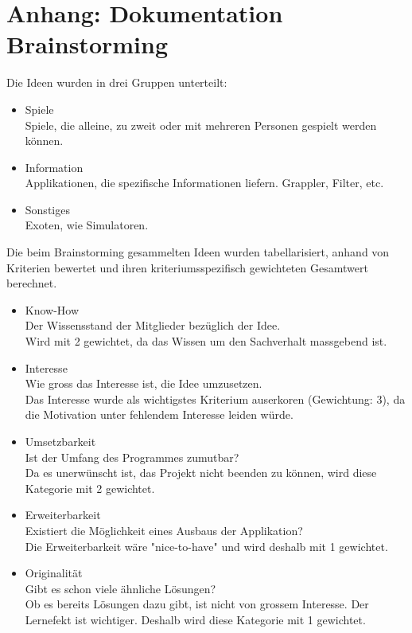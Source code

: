 \documentclass[10pt,a4paper,titlepage,twoside,german]{zhawreprt}
\begin{document}
\chapter{Anhang: Dokumentation Brainstorming}\label{chp:AppendixBrainstorming}
Die Ideen wurden in drei Gruppen unterteilt:
\begin{itemize}
\item Spiele\\
Spiele, die alleine, zu zweit oder mit mehreren Personen gespielt werden können.
\item Information\\
Applikationen, die spezifische Informationen liefern. Grappler, Filter, etc.
\item Sonstiges\\
Exoten, wie Simulatoren.
\end{itemize}
Die beim Brainstorming gesammelten Ideen wurden tabellarisiert, anhand von Kriterien bewertet und ihren kriteriumsspezifisch gewichteten Gesamtwert berechnet.
\begin{itemize}
\item Know-How\\
Der Wissensstand der Mitglieder bezüglich der Idee.\\
Wird mit 2 gewichtet, da das Wissen um den Sachverhalt massgebend ist.
\item Interesse\\
Wie gross das Interesse ist, die Idee umzusetzen.\\
Das Interesse wurde als wichtigstes Kriterium auserkoren (Gewichtung: 3), da die Motivation unter fehlendem Interesse leiden würde.
\item Umsetzbarkeit\\
Ist der Umfang des Programmes zumutbar?\\
Da es unerwünscht ist, das Projekt nicht beenden zu können, wird diese Kategorie mit 2 gewichtet.
\item Erweiterbarkeit\\
Existiert die Möglichkeit eines Ausbaus der Applikation?\\
Die Erweiterbarkeit wäre "nice-to-have" und wird deshalb mit 1 gewichtet.
\item Originalität\\
Gibt es schon viele ähnliche Lösungen?\\
Ob es bereits Lösungen dazu gibt, ist nicht von grossem Interesse. Der Lernefekt ist wichtiger. Deshalb wird diese Kategorie mit 1 gewichtet.
\end{itemize}
\end{document}
